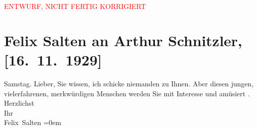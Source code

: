 
\begin{center}
            \textcolor{red}{ENTWURF, NICHT FERTIG KORRIGIERT}
                      \end{center}
            
         
         \renewcommand{\erwaehntePersonen}{Personen: Felix Salten, Boris Sapiro}
         \renewcommand{\erwaehnteOrte}{Orte: Wien}
         \renewcommand{\erwaehnteWerke}{}
               \section[Felix Salten an Arthur Schnitzler, {[}16. 11. 1929{]}]{ Felix Salten an Arthur Schnitzler, {[}16. 11. 1929{]}}\nopagebreak{}\rehead{ }\begin{ledgroupsized}[t]{13cm}\normalsize\beginnumbering \toendnotes[C]{\smallbreak\pagebreak[2]} 
\toendnotes[C]{\smallbreak}\pstart
           \raggedleft{}{\pb}Samstag. \pend
           \pstart
           Lieber, Sie wissen, ich schicke niemanden zu Ihnen. Aber diesen
               jungen, vielerfahrenen, merkwürdigen Menschen werden Sie mit Interesse und amüsiert \label{K_L03589-1v}\label{K_L03589-1h}.\pend
           \pstart
           Herzlichst {\\[\baselineskip]}Ihr {\\[\baselineskip]}\spacefill\mbox{Felix Salten}\pend
           \leftskip=0em{}
         
         \endnumbering{}\end{ledgroupsized}\begin{anhang}\end{anhang}\newcommand{\dateiname}{L03589}\newcommand{\titel}{Felix Salten an Arthur Schnitzler, [16. 11. 1929]}\newcommand{\editorInnen}{Martin Anton Müller und Laura Untner}
      